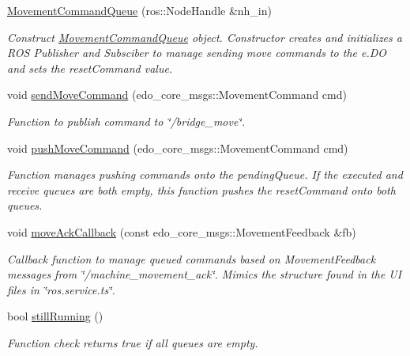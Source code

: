 \begin{DoxyCompactItemize}
\item 
\hyperlink{classMovementCommandQueue_a64a840c32950ced241bc82e535a746a6}{Movement\+Command\+Queue} (ros\+::\+Node\+Handle \&nh\+\_\+in)
\begin{DoxyCompactList}\small\item\em Construct \hyperlink{classMovementCommandQueue}{Movement\+Command\+Queue} object. Constructor creates and initializes a R\+OS Publisher and Subsciber to manage sending move commands to the e.\+DO and sets the reset\+Command value. \end{DoxyCompactList}\item 
void \hyperlink{classMovementCommandQueue_aca360bce959e2734bcc8b62c7d62fa99}{send\+Move\+Command} (edo\+\_\+core\+\_\+msgs\+::\+Movement\+Command cmd)
\begin{DoxyCompactList}\small\item\em Function to publish command to \char`\"{}/bridge\+\_\+move\char`\"{}. \end{DoxyCompactList}\item 
void \hyperlink{classMovementCommandQueue_a6c6cab982ebf66f04144717577f49195}{push\+Move\+Command} (edo\+\_\+core\+\_\+msgs\+::\+Movement\+Command cmd)
\begin{DoxyCompactList}\small\item\em Function manages pushing commands onto the pending\+Queue. If the executed and receive queues are both empty, this function pushes the reset\+Command onto both queues. \end{DoxyCompactList}\item 
void \hyperlink{classMovementCommandQueue_ad93609602a844e3e58dda33a108439d4}{move\+Ack\+Callback} (const edo\+\_\+core\+\_\+msgs\+::\+Movement\+Feedback \&fb)
\begin{DoxyCompactList}\small\item\em Callback function to manage queued commands based on Movement\+Feedback messages from \char`\"{}/machine\+\_\+movement\+\_\+ack\char`\"{}. Mimics the structure found in the UI files in \char`\"{}ros.\+service.\+ts\char`\"{}. \end{DoxyCompactList}\item 
bool \hyperlink{classMovementCommandQueue_a107dfd026447804dd67e0dba296657f3}{still\+Running} ()
\begin{DoxyCompactList}\small\item\em Function check returns true if all queues are empty. \end{DoxyCompactList}\end{DoxyCompactItemize}


